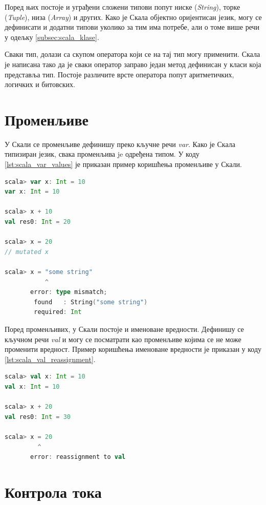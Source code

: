 \documentclass[12pt,oneside]{memoir}
\begin{document}
Поред њих постоје и уграђени сложени типови попут ниске (\textit{String}), торке (\textit{Tuple}), низа (\textit{Array}) и других. Како је Скала објектно оријентисан језик, могу се дефинисати и додатни типови уколико за тим има потребе, али о томе више речи у одељку \ref{subsec:scala_klase}.

Сваки тип, долази са скупом оператора који се на тај тип могу применити. Скала је написана тако да је сваки оператор заправо један метод дефинисан у класи која представља тип. Постоје различите врсте оператора попут аритметичких, логичких и битовских.

\section{Променљиве}
\label{sec:scala_prom}

У Скали се променљиве дефинишу преко кључне речи \textit{var}. Како је Скала типизиран језик, свака променљива je одређена типом. У коду \ref{lst:scala_var_values} је приказан пример коришћења променљиве у Скали.

\begin{lstlisting}[language=Scala, caption={Променљиве у Скали}, label={lst:scala_var_values}, basicstyle=\small]
scala> var x: Int = 10
var x: Int = 10

scala> x + 10
val res0: Int = 20

scala> x = 20
// mutated x

scala> x = "some string"
           ^
       error: type mismatch;
        found   : String("some string")
        required: Int
\end{lstlisting}

Поред променљивих, у Скали постоје и именоване вредности. Дефинишу се кључном речи \textit{val} и могу се посматрати као променљиве којима се не може променити вредност. Пример коришћења именоване вредности је приказан у коду \ref{lst:scala_val_reassignment}.

\begin{lstlisting}[language=Scala, caption={Именоване вредности у Скали}, label={lst:scala_val_reassignment}, basicstyle=\small]
scala> val x: Int = 10
val x: Int = 10

scala> x + 20
val res0: Int = 30

scala> x = 20
         ^
       error: reassignment to val
\end{lstlisting}

\section{Контрола тока}
\label{sec:scala_kontr_toka}
\end{document}
